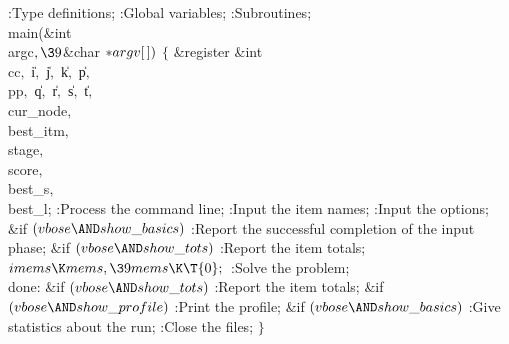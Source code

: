:Type definitions\X;\6
:Global variables\X;\6
:Subroutines\X;\7
\\{main}(\&{int} \\{argc}${},\39{}$\&{char} ${}{*}\\{argv}[\,]){}$\1\1\2\2\6
${}\{{}$\1\6
\&{register} \&{int} \\{cc}${},{}$ \|i${},{}$ \|j${},{}$ \|k${},{}$ \|p${},{}$ %
\\{pp}${},{}$ \|q${},{}$ \|r${},{}$ \|s${},{}$ \|t${},{}$ \\{cur\_node}${},{}$ %
\\{best\_itm}${},{}$ \\{stage}${},{}$ \\{score}${},{}$ \\{best\_s}${},{}$ %
\\{best\_l};\7
:Process the command line\X;\6
:Input the item names\X;\6
:Input the options\X;\6
\&{if} ${}(\\{vbose}\AND\\{show\_basics}){}$\1\5
:Report the successful completion of the input phase\X;\2\6
\&{if} ${}(\\{vbose}\AND\\{show\_tots}){}$\1\5
:Report the item totals\X;\2\6
${}\\{imems}\K\\{mems},\39\\{mems}\K\T{0};{}$\6
:Solve the problem\X;\6
\4\\{done}:\5
\&{if} ${}(\\{vbose}\AND\\{show\_tots}){}$\1\5
:Report the item totals\X;\2\6
\&{if} ${}(\\{vbose}\AND\\{show\_profile}){}$\1\5
:Print the profile\X;\2\6
\&{if} ${}(\\{vbose}\AND\\{show\_basics}){}$\1\5
:Give statistics about the run\X;\2\6
:Close the files\X;\6
\4${}\}{}$\2\par
\fi

